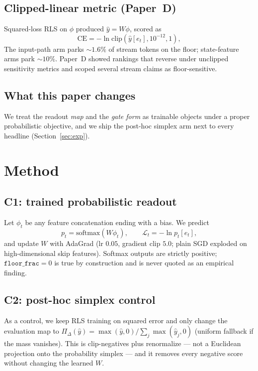 \documentclass[preprint,12pt]{elsarticle}
\begin{document}
\subsection{Clipped-linear metric (Paper~D)}
Squared-loss RLS on $\phi$ produced $\hat y=W\phi$, scored as
\begin{equation}
\mathrm{CE}=-\ln\mathrm{clip}(\hat y[e_t],10^{-12},1),
\end{equation}
The input-path arm parks $\sim1.6\%$ of stream tokens on the floor;
state-feature arms park $\sim10\%$. Paper~D showed rankings that
reverse under unclipped sensitivity metrics and scoped several stream
claims as floor-sensitive.

\subsection{What this paper changes}
We treat the readout \emph{map} and the \emph{gate form} as trainable
objects under a proper probabilistic objective, and we ship the
post-hoc simplex arm next to every headline (Section~\ref{sec:exp}).

\section{Method}
\label{sec:method}

\subsection{C1: trained probabilistic readout}
Let $\phi_t$ be any feature concatenation ending with a bias. We
predict
\begin{equation}
p_t=\mathrm{softmax}(W\phi_t),\qquad
\mathcal{L}_t=-\ln p_t[e_t],
\end{equation}
and update $W$ with AdaGrad (lr $0.05$, gradient clip $5.0$; plain SGD
exploded on high-dimensional skip features). Softmax outputs are
strictly positive; $\texttt{floor\_frac}=0$ is true by construction and
is never quoted as an empirical finding.

\subsection{C2: post-hoc simplex control}
As a control, we keep RLS training on squared error and only change
the evaluation map to
$\Pi_\Delta(\hat y)=\max(\hat y,0)/\sum_j\max(\hat y_j,0)$ (uniform
fallback if the mass vanishes). This is clip-negatives plus
renormalize --- not a Euclidean projection onto the probability simplex
--- and it removes every negative score without changing the learned $W$.
\end{document}
